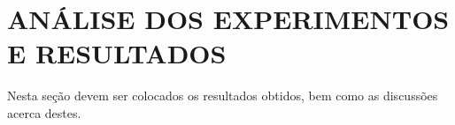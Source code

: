 \chapter{ANÁLISE DOS EXPERIMENTOS E RESULTADOS}\label{chp:AnaliseResultados}


Nesta seção devem ser colocados os resultados obtidos, bem como as discussões acerca destes.